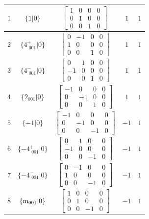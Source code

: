 \documentclass[fleqn,8pt]{jsarticle}
\begin{document}
\begin{longtable}{ccccc}
$ 1 $ & $ \{1|0\} $ & $ \begin{bmatrix} 1 & 0 & 0 & 0 \\ 0 & 1 & 0 & 0 \\ 0 & 0 & 1 & 0 \end{bmatrix} $ & $ 1 $ & $ 1 $ \\ \hline
$ 2 $ & $ \{4^{+}_{\,\,001}|0\} $ & $ \begin{bmatrix} 0 & -1 & 0 & 0 \\ 1 & 0 & 0 & 0 \\ 0 & 0 & 1 & 0 \end{bmatrix} $ & $ 1 $ & $ 1 $ \\ \hline
$ 3 $ & $ \{4^{-}_{\,\,001}|0\} $ & $ \begin{bmatrix} 0 & 1 & 0 & 0 \\ -1 & 0 & 0 & 0 \\ 0 & 0 & 1 & 0 \end{bmatrix} $ & $ 1 $ & $ 1 $ \\ \hline
$ 4 $ & $ \{2{}_{001}|0\} $ & $ \begin{bmatrix} -1 & 0 & 0 & 0 \\ 0 & -1 & 0 & 0 \\ 0 & 0 & 1 & 0 \end{bmatrix} $ & $ 1 $ & $ 1 $ \\ \hline
$ 5 $ & $ \{-1|0\} $ & $ \begin{bmatrix} -1 & 0 & 0 & 0 \\ 0 & -1 & 0 & 0 \\ 0 & 0 & -1 & 0 \end{bmatrix} $ & $ -1 $ & $ 1 $ \\ \hline
$ 6 $ & $ \{-4^{+}_{\,\,001}|0\} $ & $ \begin{bmatrix} 0 & 1 & 0 & 0 \\ -1 & 0 & 0 & 0 \\ 0 & 0 & -1 & 0 \end{bmatrix} $ & $ -1 $ & $ 1 $ \\ \hline
$ 7 $ & $ \{-4^{-}_{\,\,001}|0\} $ & $ \begin{bmatrix} 0 & -1 & 0 & 0 \\ 1 & 0 & 0 & 0 \\ 0 & 0 & -1 & 0 \end{bmatrix} $ & $ -1 $ & $ 1 $ \\ \hline
$ 8 $ & $ \{{\rm m}_{001}|0\} $ & $ \begin{bmatrix} 1 & 0 & 0 & 0 \\ 0 & 1 & 0 & 0 \\ 0 & 0 & -1 & 0 \end{bmatrix} $ & $ -1 $ & $ 1 $ \\ \hline

\end{longtable}
\end{document}
